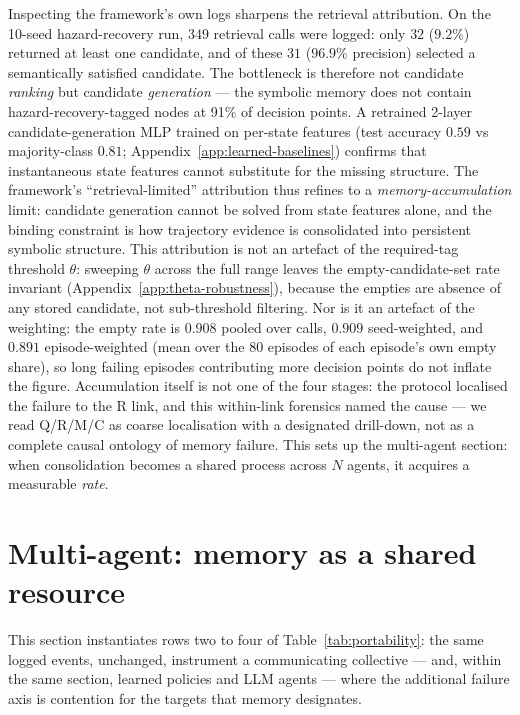 \documentclass{article}
\begin{document}
Inspecting the framework's own logs sharpens the retrieval attribution. On the 10-seed hazard-recovery run, $349$ retrieval calls were logged: only $32$ ($9.2\%$) returned at least one candidate, and of these $31$ ($96.9\%$ precision) selected a semantically satisfied candidate. The bottleneck is therefore not candidate \emph{ranking} but candidate \emph{generation} --- the symbolic memory does not contain hazard-recovery-tagged nodes at 91\% of decision points. A retrained 2-layer candidate-generation MLP trained on per-state features (test accuracy $0.59$ vs majority-class $0.81$; Appendix~\ref{app:learned-baselines}) confirms that instantaneous state features cannot substitute for the missing structure. The framework's ``retrieval-limited'' attribution thus refines to a \emph{memory-accumulation} limit: candidate generation cannot be solved from state features alone, and the binding constraint is how trajectory evidence is consolidated into persistent symbolic structure. This attribution is not an artefact of the required-tag threshold $\theta$: sweeping $\theta$ across the full range leaves the empty-candidate-set rate invariant (Appendix~\ref{app:theta-robustness}), because the empties are absence of any stored candidate, not sub-threshold filtering. Nor is it an artefact of the weighting: the empty rate is $0.908$ pooled over calls, $0.909$ seed-weighted, and $0.891$ episode-weighted (mean over the 80 episodes of each episode's own empty share), so long failing episodes contributing more decision points do not inflate the figure. Accumulation itself is not one of the four stages: the protocol localised the failure to the R link, and this within-link forensics named the cause --- we read Q/R/M/C as coarse localisation with a designated drill-down, not as a complete causal ontology of memory failure. This sets up the multi-agent section: when consolidation becomes a shared process across $N$ agents, it acquires a measurable \emph{rate}.

\section{Multi-agent: memory as a shared resource}
\label{sec:multi}

This section instantiates rows two to four of
Table~\ref{tab:portability}: the same logged events, unchanged,
instrument a communicating collective --- and, within the same
section, learned policies and LLM agents --- where the additional
failure axis is contention for the targets that memory designates.
\end{document}
